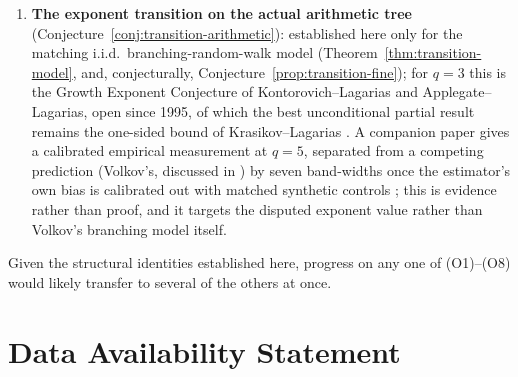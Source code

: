 \documentclass[11pt]{article}
\theoremstyle{definition}
\theoremstyle{remark}
\begin{document}
\begin{enumerate}[label=(O\arabic*)]
  exponent, rather than directly on Conjecture~\ref{conj:tail-index}.
  A sample of $10^5$ roots gives a clean GPD threshold-stability
  plateau at the predicted value across every threshold level tested,
  a tightly concentrated bias-corrected Hill estimate consistent with
  it across all headroom levels, and a Vuong test against a truncated
  lognormal alternative that does not favor the alternative. Two
  calibration checks (against an exact synthetic Pareto sample of the
  predicted index, and against a deliberately mis-specified
  normalization exponent) found no artifact behind this reading. That
  companion conjecture is strongly supported for $q=5$, though not
  proved: the Vuong test yields non-rejection rather than
  confirmation, and the finite-depth factors remain pre-asymptotic at
  the headroom reached (their median continues to drift with headroom
  even as the estimated tail index does not). A direct, exact test of
  $W_q$'s own tail, the martingale of Conjecture~\ref{conj:tail-index}
  itself, remains inconclusive.
\item \textbf{The exponent transition on the actual arithmetic tree}
  (Conjecture~\ref{conj:transition-arithmetic}): established here only
  for the matching i.i.d.\ branching-random-walk model
  (Theorem~\ref{thm:transition-model}, and, conjecturally,
  Conjecture~\ref{prop:transition-fine}); for $q=3$ this is the
  Growth Exponent Conjecture of Kontorovich--Lagarias and
  Applegate--Lagarias, open since 1995, of
  which the best unconditional partial result remains the one-sided
  bound of Krasikov--Lagarias \cite{KrasikovLagarias2003}. A companion
  paper gives a calibrated empirical measurement at $q=5$, separated
  from a competing prediction (Volkov's, discussed in
  \cite{KontorovichLagarias2009}) by seven band-widths once the
  estimator's own bias is calibrated out with matched synthetic
  controls \cite{KLVolkovCompanion}; this is evidence rather than
  proof, and it targets the disputed exponent value rather than
  Volkov's branching model itself.
\end{enumerate}

Given the structural identities established here, progress on any one
of (O1)--(O8) would likely transfer to several of the others at once.

\section*{Data Availability Statement}
\end{document}
